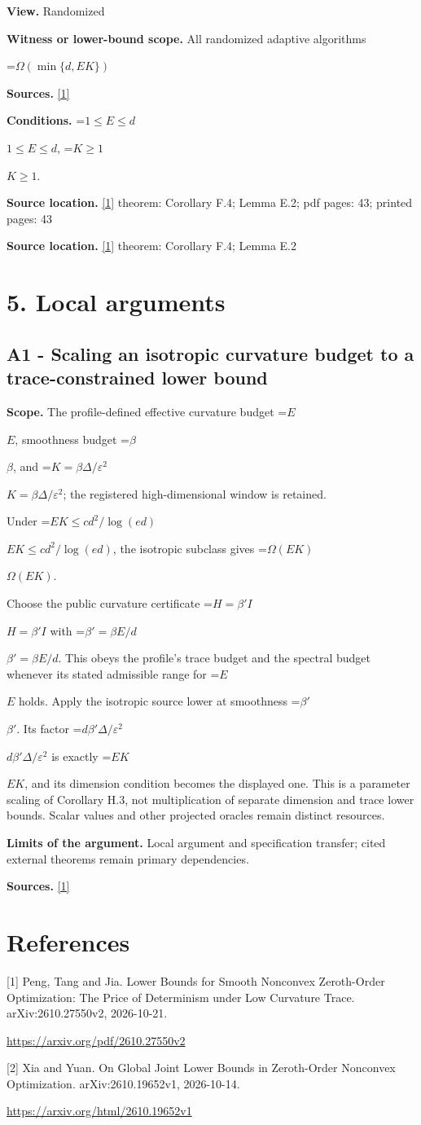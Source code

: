 \documentclass[10pt,a4paper]{article}
\newcommand{\AtlasMath}[1]{\par\begingroup\centering\setbox0=\hbox{$\displaystyle #1$}\ifdim\wd0>1.4\linewidth\typeout{ATLAS WIDE FORMULA: \the\wd0}\fi\ifdim\wd0>\linewidth\resizebox{\linewidth}{!}{\box0}\else\box0\fi\par\endgroup}
\newcommand{\AtlasInlineMath}[1]{\begingroup\setbox0=\hbox{$#1$}\ifdim\wd0>.4\linewidth\endgroup\AtlasMath{#1}\else\endgroup$#1$\fi}
\begin{document}
\textbf{View.} Randomized

\textbf{Witness or lower-bound scope.} All randomized adaptive algorithms

\AtlasMath{\Omega(\min\{d,EK\})}
\textbf{Sources.} \href{https://arxiv.org/pdf/2610.27550v2}{[1]}

\textbf{Conditions.} \AtlasInlineMath{1\le E\le d}, \AtlasInlineMath{K\ge1}.

\textbf{Source location.} \href{https://arxiv.org/pdf/2610.27550v2}{[1]} theorem: Corollary F.4; Lemma E.2; pdf pages: 43; printed pages: 43

\textbf{Source location.} \href{https://arxiv.org/pdf/2610.27550v2}{[1]} theorem: Corollary F.4; Lemma E.2

\section{5. Local arguments}
\subsection{A1 - Scaling an isotropic curvature budget to a trace-constrained lower bound}
\textbf{Scope.} The profile-defined effective curvature budget \AtlasInlineMath{E}, smoothness budget \AtlasInlineMath{\beta}, and \AtlasInlineMath{K=\beta\Delta/\varepsilon^2}; the registered high-dimensional window is retained.

Under \AtlasInlineMath{EK\le c d^2/\log(ed)}, the isotropic subclass gives \AtlasInlineMath{\Omega(EK)}.

Choose the public curvature certificate \AtlasInlineMath{H=\beta'I} with \AtlasInlineMath{\beta'=\beta E/d}. This obeys the profile's trace budget and the spectral budget whenever its stated admissible range for \AtlasInlineMath{E} holds. Apply the isotropic source lower at smoothness \AtlasInlineMath{\beta'}. Its factor \AtlasInlineMath{d\beta'\Delta/\varepsilon^2} is exactly \AtlasInlineMath{EK}, and its dimension condition becomes the displayed one. This is a parameter scaling of Corollary H.3, not multiplication of separate dimension and trace lower bounds. Scalar values and other projected oracles remain distinct resources.

\textbf{Limits of the argument.} Local argument and specification transfer; cited external theorems remain primary dependencies.

\textbf{Sources.} \href{https://arxiv.org/pdf/2610.27550v2}{[1]}

\section{References}
[1] Peng, Tang and Jia. Lower Bounds for Smooth Nonconvex Zeroth-Order Optimization: The Price of Determinism under Low Curvature Trace. arXiv:2610.27550v2, 2026-10-21.

\url{https://arxiv.org/pdf/2610.27550v2}

[2] Xia and Yuan. On Global Joint Lower Bounds in Zeroth-Order Nonconvex Optimization. arXiv:2610.19652v1, 2026-10-14.

\url{https://arxiv.org/html/2610.19652v1}
\end{document}
